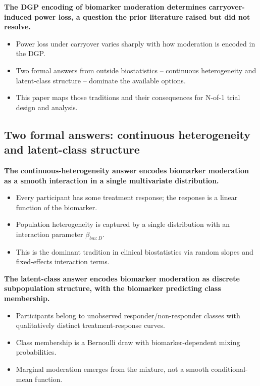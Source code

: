 \documentclass[
  11pt,
]{article}
\begin{document}
\textbf{The DGP encoding of biomarker moderation determines
carryover-induced power loss, a question the prior literature raised
but did not resolve.}

\begin{itemize}\setlength{\itemsep}{2pt}\setlength{\parskip}{0pt}
\item Power loss under carryover varies sharply with how moderation
  is encoded in the DGP.
\item Two formal answers from outside biostatistics -- continuous
  heterogeneity and latent-class structure -- dominate the available
  options.
\item This paper maps those traditions and their consequences for
  N-of-1 trial design and analysis.
\end{itemize}

\subsection{Two formal answers: continuous heterogeneity and latent-class structure}\label{two-formal-answers-continuous-heterogeneity-and-latent-class-structure}

\textbf{The continuous-heterogeneity answer encodes biomarker
moderation as a smooth interaction in a single multivariate
distribution.}

\begin{itemize}\setlength{\itemsep}{2pt}\setlength{\parskip}{0pt}
\item Every participant has some treatment response; the response is a
  linear function of the biomarker.
\item Population heterogeneity is captured by a single distribution
  with an interaction parameter $\beta_{bm:D}$.
\item This is the dominant tradition in clinical biostatistics via
  random slopes and fixed-effects interaction terms.
\end{itemize}

\textbf{The latent-class answer encodes biomarker moderation as
discrete subpopulation structure, with the biomarker predicting class
membership.}

\begin{itemize}\setlength{\itemsep}{2pt}\setlength{\parskip}{0pt}
\item Participants belong to unobserved responder/non-responder classes
  with qualitatively distinct treatment-response curves.
\item Class membership is a Bernoulli draw with biomarker-dependent
  mixing probabilities.
\item Marginal moderation emerges from the mixture, not a smooth
  conditional-mean function.
\end{itemize}
\end{document}
